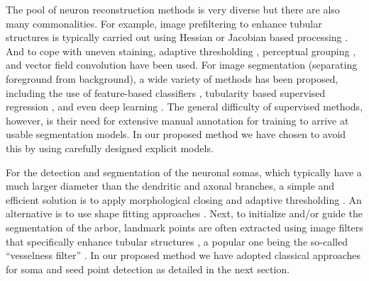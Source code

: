 The pool of neuron reconstruction methods is very diverse \citep{meijering2010neuron, donohue2011automated, acciai2016automated, peng2015bigneuron} but there are also many commonalities. For example, image prefiltering to enhance tubular structures is typically carried out using Hessian or Jacobian based processing \citep{xiong2006, al2008improved, yuan2009mdl, wang2011broadly}. And to cope with uneven staining, adaptive thresholding \citep{zhou2015adaptive}, perceptual grouping \citep{narayanaswamy20113}, and vector field convolution \citep{mukherjee2015tubularity} have been used. For image segmentation (separating foreground from background), a wide variety of methods has been proposed, including the use of feature-based classifiers \citep{turetken2011automated, chen2015smarttracing, jimenez2015improved}, tubularity based supervised regression \citep{sironi2016multiscale}, and even deep learning \citep{li2017deep}. The general difficulty of supervised methods, however, is their need for extensive manual annotation for training to arrive at usable segmentation models. In our proposed method we have chosen to avoid this by using carefully designed explicit models.

For the detection and segmentation of the neuronal somas, which typically have a much larger diameter than the dendritic and axonal branches, a simple and efficient solution is to apply morphological closing and adaptive thresholding \citep{yan2013automated}. An alternative is to use shape fitting approaches \citep{quan2013neurogps}. Next, to initialize and/or guide the segmentation of the arbor, landmark points are often extracted using image filters that specifically enhance tubular structures \citep{wang2011broadly, turetken2011automated, choromanska2012automatic, su2012junction, radojevic2016fuzzy}, a popular one being the so-called ``vesselness filter'' \citep{frangi1998multiscale}. In our proposed method we have adopted classical approaches for soma and seed point detection as detailed in the next section.

